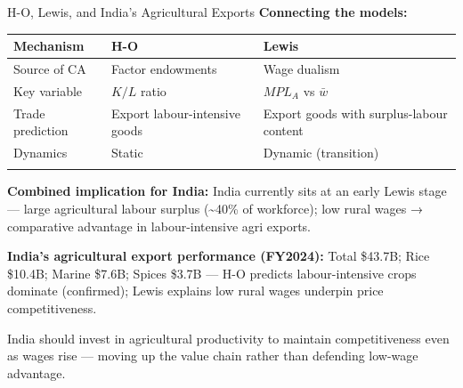 \documentclass[
  ignorenonframetext,
  aspectratio=169,
]{beamer}
\makeatletter
\let\quarto@originallabel\label
\DeclareRobustCommand*{\label}[1]{\quarto@originallabel{#1}}
\makeatother
\begin{document}
\begin{frame}{H-O, Lewis, and India's Agricultural Exports}
\label{h-o-lewis-and-indias-agricultural-exports}
\textbf{Connecting the models:}

\begin{longtable}[]{@{}
  >{\raggedright\arraybackslash}p{}
  >{\raggedright\arraybackslash}p{}
  >{\raggedright\arraybackslash}p{}@{}}
\toprule\noalign{}
\begin{minipage}[b]{\linewidth}\raggedright
Mechanism
\end{minipage} & \begin{minipage}[b]{\linewidth}\raggedright
H-O
\end{minipage} & \begin{minipage}[b]{\linewidth}\raggedright
Lewis
\end{minipage} \\
\midrule\noalign{}
\endhead
Source of CA & Factor endowments & Wage dualism \\
Key variable & \(K/L\) ratio & \(MPL_A\) vs \(\bar{w}\) \\
Trade prediction & Export labour-intensive goods & Export goods with
surplus-labour content \\
Dynamics & Static & Dynamic (transition) \\
\bottomrule\noalign{}
\end{longtable}

\textbf{Combined implication for India:} India currently sits at an
early Lewis stage --- large agricultural labour surplus
(\textasciitilde40\% of workforce); low rural wages → comparative
advantage in labour-intensive agri exports.

\textbf{India's agricultural export performance (FY2024):} Total
\$43.7B; Rice \$10.4B; Marine \$7.6B; Spices \$3.7B --- H-O predicts
labour-intensive crops dominate (confirmed); Lewis explains low rural
wages underpin price competitiveness.

India should invest in agricultural productivity to maintain
competitiveness even as wages rise --- moving up the value chain rather
than defending low-wage advantage.
\end{frame}
\end{document}
